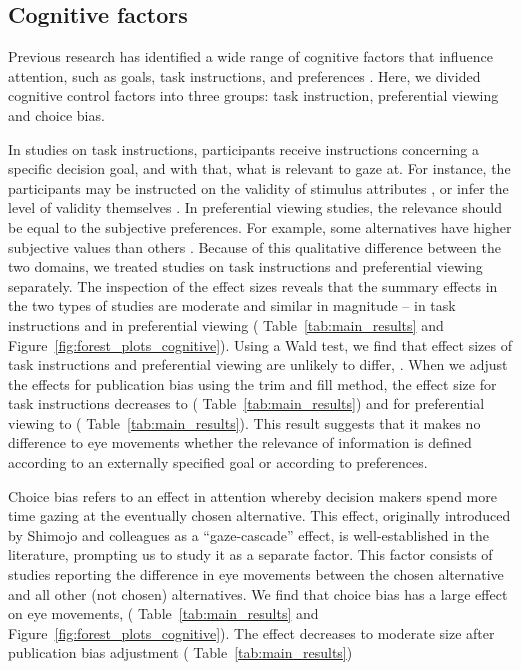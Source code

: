 \subsection{Cognitive factors}

Previous research has identified a wide range of cognitive factors that influence attention, such as goals, task instructions, and preferences \citep[for a review see][]{orquin2013a}. Here, we divided cognitive control factors into three groups: task instruction, preferential viewing and choice bias. 

In studies on task instructions, participants receive instructions concerning a specific decision goal, and with that, what is relevant to gaze at. For instance, the participants may be instructed on the validity of stimulus attributes \citep{krefeld-schwalb2019a}, or infer the level of validity themselves \citep{bialkova2014a}. In preferential viewing studies, the relevance should be equal to the subjective preferences. For example, some alternatives have higher subjective values than others \citep{kim2012a}. Because of this qualitative difference between the two domains, we treated studies on task instructions and preferential viewing separately. 
The inspection of the effect sizes reveals that the summary effects in the two types of studies are moderate and similar in magnitude -- in task instructions  
and in preferential viewing ( Table~\ref{tab:main_results} and Figure~\ref{fig:forest_plots_cognitive}). Using a Wald test, we find that effect sizes of task instructions and preferential viewing are unlikely to differ, . 
When we adjust the effects for publication bias using the trim and fill method, the effect size for task instructions decreases to ( Table~\ref{tab:main_results}) and for preferential viewing to ( Table~\ref{tab:main_results}). This result suggests that it makes no difference to eye movements whether the relevance of information is defined according to an externally specified goal or according to preferences. 

Choice bias refers to an effect in attention whereby decision makers spend more time gazing at the eventually chosen alternative. This effect, originally introduced by Shimojo and colleagues \citep{shimojo2003a} as a ``gaze-cascade'' effect, is well-established in the literature, prompting us to study it as a separate factor. This factor consists of studies reporting the difference in eye movements between the chosen alternative and all other (not chosen) alternatives. We find that choice bias has a large effect on eye movements, ( Table~\ref{tab:main_results} and Figure~\ref{fig:forest_plots_cognitive}). The effect decreases to moderate size after publication bias adjustment ( Table~\ref{tab:main_results})


